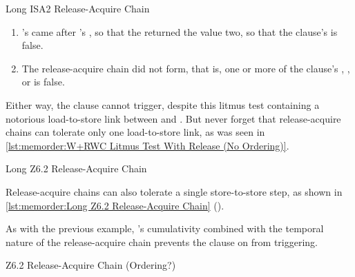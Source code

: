 \begin{listing}

\caption{Long ISA2 Release-Acquire Chain}
\label{lst:memorder:Long ISA2 Release-Acquire Chain}
\end{listing}

\begin{enumerate}
\item	{}'s  came after 's
	, so that the  returned
	the value two, so that the  clause's 
	is false.
\item	The release-acquire chain did not form, that is, one or more
	of the  clause's , , or 
	is false.
\end{enumerate}

Either way, the  clause cannot trigger, despite this litmus
test containing a notorious load-to-store link between
 and .
But never forget that release-acquire chains can tolerate only one
load-to-store link, as was seen in
\cref{lst:memorder:W+RWC Litmus Test With Release (No Ordering)}.

\begin{listing}

\caption{Long Z6.2 Release-Acquire Chain}
\label{lst:memorder:Long Z6.2 Release-Acquire Chain}
\end{listing}

Release-acquire chains can also tolerate a single store-to-store step,
as shown in
\cref{lst:memorder:Long Z6.2 Release-Acquire Chain}
().
\begin{fcvref}
As with the previous example, 's cumulativity
combined with the temporal nature of the release-acquire chain
prevents the  clause on  from triggering.
\end{fcvref}

\begin{listing}

\caption{Z6.2 Release-Acquire Chain (Ordering?)}
\label{lst:memorder:Z6.2 Release-Acquire Chain (Ordering?)}
\end{listing}

